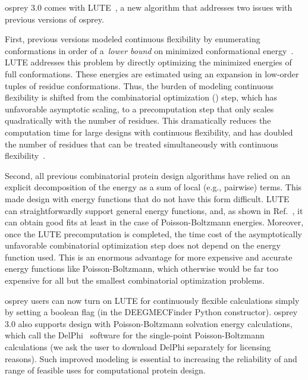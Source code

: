 {\sc osprey} 3.0 comes with LUTE~\cite{LUTE_RECOMB}, a new algorithm that addresses two issues with previous versions of {\sc osprey}.  

First, previous versions modeled continuous flexibility by enumerating conformations in order of a~\textit{lower bound} on minimized conformational energy~\cite{minDEE,iMinDEE}. LUTE addresses this problem by directly optimizing the minimized energies of full conformations.  These energies are estimated using an expansion in low-order tuples of residue conformations.  Thus, the burden of modeling continuous flexibility is shifted from the combinatorial optimization (\as) step, which has unfavorable asymptotic scaling, to a precomputation step that only scales quadratically with the number of residues. This dramatically reduces the computation time for large designs with continuous flexibility, and has doubled the number of residues that can be treated simultaneously with continuous flexibility~\cite{LUTE_RECOMB}.    

Second, all previous combinatorial protein design algorithms have relied on an explicit decomposition of the energy as a sum of local (e.g., pairwise) terms.  This made design with energy functions that do not have this form difficult. LUTE can straightforwardly support general energy functions, and, as shown in Ref.~, it can obtain good fits at least in the case of Poisson-Boltzmann energies.  Moreover, once the LUTE precomputation is completed, the time cost of the asymptotically unfavorable combinatorial optimization step does not depend on the energy function used.  This is an enormous advantage for more expensive and accurate energy functions like Poisson-Boltzmann, which otherwise would be far too expensive for all but the smallest combinatorial optimization problems.  

{\sc osprey} users can now turn on LUTE for continuously flexible calculations simply by setting a boolean flag (in the DEEGMECFinder Python constructor). 
{\sc osprey} 3.0 also supports design with Poisson-Boltzmann solvation energy calculations, which call the DelPhi~\cite{OSOR,DelPhi_surface} software for the single-point Poisson-Boltzmann calculations (we ask the user to download DelPhi separately for licensing reasons). Such improved modeling is essential to increasing the reliability of and range of feasible uses for computational protein design.  